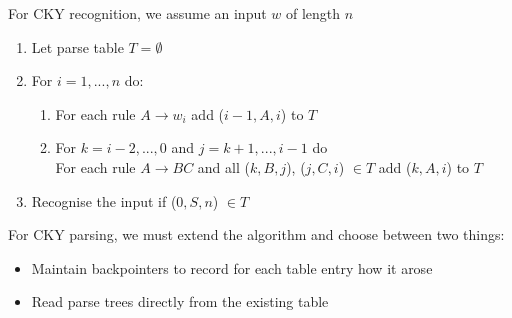\documentclass[Report.tex]{subfiles}
\begin{document}
For CKY recognition, we assume an input $w$ of length $n$
\begin{enumerate}
\item Let parse table $T = \emptyset$
\item For $i = 1, ..., n$ do:
	\begin{enumerate}
	\item For each rule $A \rightarrow w_i$ add ($i - 1, A, i$) to $T$
	\item For $k = i - 2, ..., 0$ and $j = k+1, ..., i - 1$ do \\
	For each rule $A \rightarrow BC$ and all ($k, B, j$), ($j, C, i$) $\in T$
	add ($k, A, i$) to $T$
	\end{enumerate}
\item Recognise the input if ($0, S, n$) $\in T$
\end{enumerate}

For CKY parsing, we must extend the algorithm and choose between two things:
\begin{itemize}
\item Maintain backpointers to record for each table entry how it arose
\item Read parse trees directly from the existing table
\end{itemize}
\end{document}
